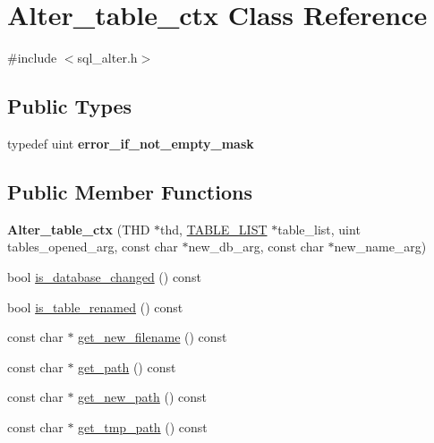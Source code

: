 \hypertarget{classAlter__table__ctx}{}\section{Alter\+\_\+table\+\_\+ctx Class Reference}
\label{classAlter__table__ctx}


{\ttfamily \#include $<$sql\+\_\+alter.\+h$>$}

\subsection*{Public Types}
\begin{DoxyCompactItemize}
\item 
\mbox{\label{classAlter__table__ctx_a348e1b3a0464e26525eac30cd964d71d}} 
typedef uint {\bfseries error\+\_\+if\+\_\+not\+\_\+empty\+\_\+mask}
\end{DoxyCompactItemize}
\subsection*{Public Member Functions}
\begin{DoxyCompactItemize}
\item 
\mbox{\label{classAlter__table__ctx_a2592025a107ce3290f523cbe6679e4cf}} 
{\bfseries Alter\+\_\+table\+\_\+ctx} (T\+HD $\ast$thd, \mbox{\hyperlink{structTABLE__LIST}{T\+A\+B\+L\+E\+\_\+\+L\+I\+ST}} $\ast$table\+\_\+list, uint tables\+\_\+opened\+\_\+arg, const char $\ast$new\+\_\+db\+\_\+arg, const char $\ast$new\+\_\+name\+\_\+arg)
\item 
bool \mbox{\hyperlink{classAlter__table__ctx_a0afbe188b4e7c462c95cc9b61431b92a}{is\+\_\+database\+\_\+changed}} () const
\item 
bool \mbox{\hyperlink{classAlter__table__ctx_a3a3b9df562431de6681bd430b9ad556e}{is\+\_\+table\+\_\+renamed}} () const
\item 
const char $\ast$ \mbox{\hyperlink{classAlter__table__ctx_a2e6f3603d771c3b94d416f77fc0bf720}{get\+\_\+new\+\_\+filename}} () const
\item 
const char $\ast$ \mbox{\hyperlink{classAlter__table__ctx_acd2655d17b12e8f08c483cf013f51e21}{get\+\_\+path}} () const
\item 
const char $\ast$ \mbox{\hyperlink{classAlter__table__ctx_a7158fc49d633764c5b49befcc76c6ba9}{get\+\_\+new\+\_\+path}} () const
\item 
const char $\ast$ \mbox{\hyperlink{classAlter__table__ctx_a016d66cd2dff6af09c6f8fd0e33979e6}{get\+\_\+tmp\+\_\+path}} () const
\end{DoxyCompactItemize}
